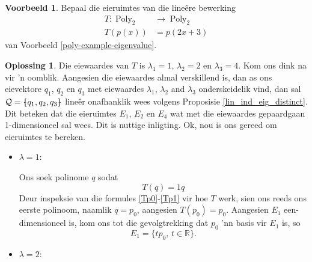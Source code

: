 \documentclass[a4paper,11pt]{book}
\theoremstyle{definition}
\newtheorem{example_environment}{Voorbeeld}[chapter]
\newtheorem*{solution}{Oplossing}
\newcommand{\basis}[1]{{\mathcal #1}}
\newenvironment{example}
	{
		\begin{oframed}
		\begin{example_environment}
	}
	{
		\end{example_environment}
		\end{oframed}
	}
\newcommand{\bmark}{\raisebox{.53ex}{\rule{.2em}{.1ex}}}
\newcommand{\bopen}{{\protect\ooalign{\{\cr\hfil\bmark\hfil\cr}}}
\newcommand{\bclose}{{\protect\ooalign{\}\cr\hfil\bmark\hfil\cr}}}
\DeclareMathOperator{\Poly}{Poly}
\begin{document}
\begin{example} \label{eigenspaces-lin-op-T} Bepaal die eieruimtes van die
	line{\^e}re bewerking
	\begin{align*}
		T : \Poly_2 & \rightarrow \Poly_2 \\
		T(p(x)) &= p(2x + 3)
	\end{align*}
	van Voorbeeld \ref{poly-example-eigenvalue}.

	\begin{solution} Die eiewaardes van $T$ is $\lambda_1 = 1$, $\lambda_2
		= 2$ en $\lambda_3 = 4$.  Kom ons dink na vir 'n oomblik. Aangesien
		die eiewaardes almal verskillend is, dan as ons eievektore $q_1$,
		$q_2$ en $q_3$ met eiewaardes $\lambda_1$, $\lambda_2$ and
		$\lambda_3$ onderskeidelik vind, dan sal $\basis{Q} = \bopen q_1,
		q_2, q_3 \bclose$ line{\^e}r onafhanklik wees volgens Proposisie
		\ref{lin_ind_eig_distinct}. Dit beteken dat die eieruimtes $E_1$,
		$E_2$ en $E_4$ wat met die eiewaardes gepaardgaan 1-dimensioneel
		sal wees. Dit is nuttige inligting. Ok, nou is ons gereed om
		eieruimtes te bereken.

		\begin{itemize}
			\item $\lambda = 1$: 

				Ons soek polinome $q$ sodat
				\[
					T(q) = 1 q
				\]
				Deur inspeksie van die formules \eqref{Tp0}-\eqref{Tp1} vir
				hoe $T$ werk, sien ons reeds ons eerste polinoom, naamlik
				$q = p_0$, aangesien $T(p_0) = p_0$. Aangesien $E_1$
				een-dimensioneel is, kom ons tot die gevolgtrekking dat
				$p_0$ 'nn basis vir $E_1$ is, so
				\[
					E_1 = \{ t p_0, \, t \in \mathbb{R}\}.
				\]

			\item $\lambda = 2$:


\end{itemize}
\end{solution}
\end{example}
\end{document}
